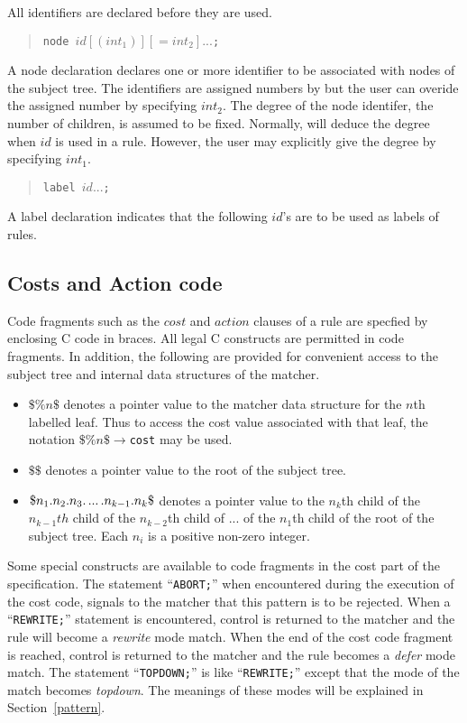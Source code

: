 All \twiglang{} identifiers are declared before they are used.

\begin{verse}
{\tt node $id[(int_1)] [= int_2] ...$;\hfil}
\end{verse}

\noindent A node declaration declares one or more identifier to be
associated with nodes of the subject tree.  The identifiers are
assigned numbers by \twigcomp{} but the user can overide the assigned number
by specifying $int_2$.  The degree of the node identifer, the
number of children, is assumed to be fixed.  Normally, \twigcomp{} will
deduce the degree when $id$ is used in a rule.  However, the user may
explicitly give the degree by specifying $int_1$.

\begin{verse}
{\tt label $id ...$;}
\end{verse}

A label declaration indicates that the following $id$'s are to be used
as labels of rules.

\subsection{Costs and Action code}

Code fragments such as the $cost$ and $action$ clauses of a rule are
specfied by enclosing C code in braces.  All legal C constructs are
permitted in code fragments.  In addition, the following are provided
for convenient access to the subject tree and internal data
structures of the matcher.

\begin{itemize}
\item $\$\%n\$$ denotes a pointer value to the matcher data
structure for the $n$th labelled leaf.  Thus to access the cost value
associated with that leaf, the notation $\$\%n\$\to${\tt cost} may be used.

\item $\$\$$ denotes a pointer value to the root of the subject
tree.

\item $\$n_1.n_2.n_3.\, \hbox{...}\,.n_{k-1}.n_k\$$ denotes
a pointer value to the $n_k$th child of the $n_{k-1}th$ child of the
$n_{k-2}$th child of \hbox{...} of the $n_1$th child of the root of
the subject tree.  Each $n_i$ is a positive non-zero integer.
\end{itemize}

Some special constructs are available to code fragments in the cost
part of the specification.  The
statement ``{\tt ABORT;}'' when encountered during the execution of
the cost code, signals to the matcher that this pattern is to be
rejected.  When a ``{\tt REWRITE;}'' statement is encountered, control
is returned to the matcher and the rule will become a {\sl rewrite}
mode match.  When the end of the cost code fragment is reached,
control is returned to the matcher and the rule becomes a {\sl defer}
mode match.
The statement ``{\tt TOPDOWN;}'' is like ``{\tt REWRITE;}'' except that
the mode of the match becomes {\sl topdown}.  The meanings of these modes
will be explained in Section~\ref{pattern}.

